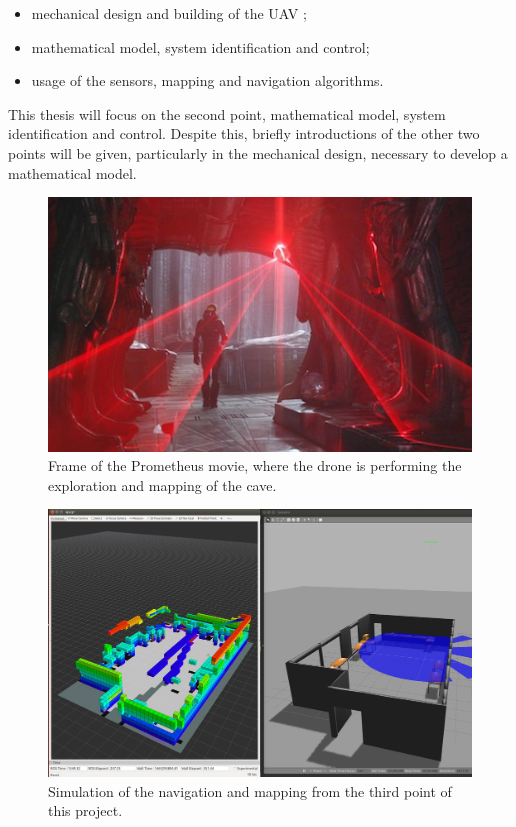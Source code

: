 \begin{itemize}
	\item mechanical design and building of the UAV \cite{Carlos};
	\item mathematical model, system identification and control;
	\item usage of the sensors, mapping and navigation algorithms.
\end{itemize}

\noindent This thesis will focus on the second point, mathematical model, system identification and control. Despite this, briefly introductions of the other two points will be given, particularly in the mechanical design, necessary to develop a mathematical model. 

\begin{figure}
	\includegraphics[scale=0.6]{images/prometheus_film.jpg}
	\caption{Frame of the Prometheus movie, where the drone is performing the exploration and mapping of the cave.}
	\label{fig:prometheusFILM}
\end{figure}

\begin{figure}
	\includegraphics[scale=0.1364]{images/simulation_Romain.png}
	\caption{Simulation of the navigation and mapping from the third point of this project.}
	\label{fig:simulationRomain}
\end{figure}

